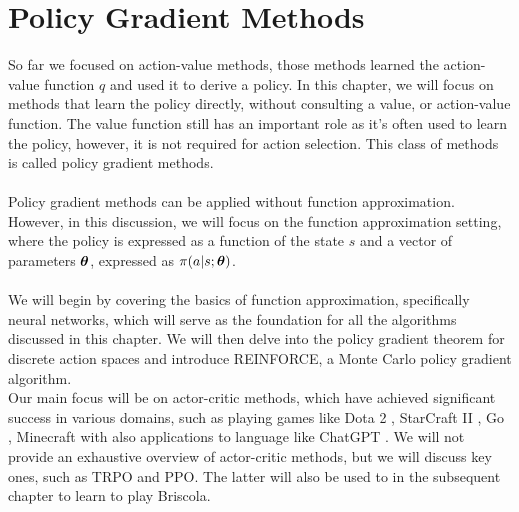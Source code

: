 \chapter{Policy Gradient Methods}
So far we focused on action-value methods, those methods learned the action-value function $q$ and used it to derive a policy. In this chapter, we will focus on methods that learn the policy directly, without consulting a value, or action-value function. The value function still has an important role as it's often used to learn the policy, however, it is not required for action selection. This class of methods is called policy gradient methods.\\\\
Policy gradient methods can be applied without function approximation. However, in this discussion, we will focus on the function approximation setting, where the policy is expressed as a function of the state $s$ and a vector of parameters $\boldsymbol{\theta}$, expressed as $\pi(a|s; \boldsymbol{\theta})$.\\\\
We will begin by covering the basics of function approximation, specifically neural networks, which will serve as the foundation for all the algorithms discussed in this chapter. We will then delve into the policy gradient theorem for discrete action spaces and introduce REINFORCE, a Monte Carlo policy gradient algorithm.\\
Our main focus will be on actor-critic methods, which have achieved significant success in various domains, such as playing games like Dota 2 \cite{open-ai-five}, StarCraft II \cite{alphastar, wang2021scc}, Go \cite{alphago-fan}, Minecraft \cite{minecraft-vpt, dreamer-v3} with also applications to language like ChatGPT \cite{instruct-gpt}. We will not provide an exhaustive overview of actor-critic methods, but we will discuss key ones, such as TRPO and PPO. The latter will also be used to in the subsequent chapter to learn to play Briscola.

